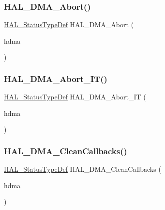 \subsubsection{\texorpdfstring{H\+A\+L\+\_\+\+D\+M\+A\+\_\+\+Abort()}{HAL\_DMA\_Abort()}}
{\footnotesize\ttfamily \hyperlink{stm32f4xx__hal__def_8h_a63c0679d1cb8b8c684fbb0632743478f}{H\+A\+L\+\_\+\+Status\+Type\+Def} H\+A\+L\+\_\+\+D\+M\+A\+\_\+\+Abort (\begin{DoxyParamCaption}\item[{\hyperlink{group___d_m_a___exported___types_ga41b754a906b86bce54dc79938970138b}{D\+M\+A\+\_\+\+Handle\+Type\+Def} $\ast$}]{hdma }\end{DoxyParamCaption})}

\mbox{\label{group___d_m_a___exported___functions___group2_ga6677d7e614747341a58ffd7a048fd390}} 
\subsubsection{\texorpdfstring{H\+A\+L\+\_\+\+D\+M\+A\+\_\+\+Abort\+\_\+\+I\+T()}{HAL\_DMA\_Abort\_IT()}}
{\footnotesize\ttfamily \hyperlink{stm32f4xx__hal__def_8h_a63c0679d1cb8b8c684fbb0632743478f}{H\+A\+L\+\_\+\+Status\+Type\+Def} H\+A\+L\+\_\+\+D\+M\+A\+\_\+\+Abort\+\_\+\+IT (\begin{DoxyParamCaption}\item[{\hyperlink{group___d_m_a___exported___types_ga41b754a906b86bce54dc79938970138b}{D\+M\+A\+\_\+\+Handle\+Type\+Def} $\ast$}]{hdma }\end{DoxyParamCaption})}

\mbox{\label{group___d_m_a___exported___functions___group2_gaf511e4e6e0653fafdd9b40ce4a08b1db}} 
\subsubsection{\texorpdfstring{H\+A\+L\+\_\+\+D\+M\+A\+\_\+\+Clean\+Callbacks()}{HAL\_DMA\_CleanCallbacks()}}
{\footnotesize\ttfamily \hyperlink{stm32f4xx__hal__def_8h_a63c0679d1cb8b8c684fbb0632743478f}{H\+A\+L\+\_\+\+Status\+Type\+Def} H\+A\+L\+\_\+\+D\+M\+A\+\_\+\+Clean\+Callbacks (\begin{DoxyParamCaption}\item[{\hyperlink{group___d_m_a___exported___types_ga41b754a906b86bce54dc79938970138b}{D\+M\+A\+\_\+\+Handle\+Type\+Def} $\ast$}]{hdma }\end{DoxyParamCaption})}

